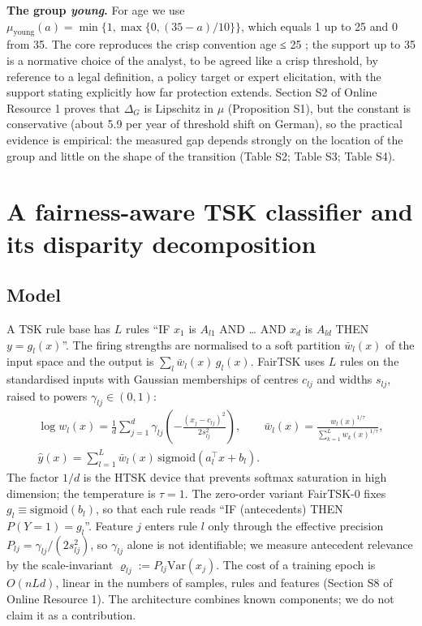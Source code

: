 \textbf{The group \emph{young}.} For age we use \(\mu_{\text{young}}(a) = \min\{1,\max\{0,(35 - a)/10\}\}\), which equals 1 up to 25 and 0 from 35. The core reproduces the crisp convention age ≤ 25 \cite{lequy}; the support up to 35 is a normative choice of the analyst, to be agreed like a crisp threshold, by reference to a legal definition, a policy target or expert elicitation, with the support stating explicitly how far protection extends. Section S2 of Online Resource 1 proves that \(\Delta_G\) is Lipschitz in \(\mu\) (Proposition S1), but the constant is conservative (about 5.9 per year of threshold shift on German), so the practical evidence is empirical: the measured gap depends strongly on the location of the group and little on the shape of the transition (Table S2; Table S3; Table S4).

\hypertarget{a-fairness-aware-tsk-classifier-and-its-disparity-decomposition}{%
\section{A fairness-aware TSK classifier and its disparity decomposition}\label{a-fairness-aware-tsk-classifier-and-its-disparity-decomposition}}

\hypertarget{model}{%
\subsection{Model}\label{model}}

A TSK rule base \cite{tsk} has \(L\) rules ``IF \(x_1\) is \(A_{l1}\) AND \ldots{} AND \(x_d\) is \(A_{ld}\) THEN \(y = g_l(x)\)''. The firing strengths are normalised to a soft partition \(\bar w_l(x)\) of the input space and the output is \(\sum_l \bar w_l(x)\, g_l(x)\). FairTSK uses \(L\) rules on the standardised inputs with Gaussian memberships of centres \(c_{lj}\) and widths \(s_{lj}\), raised to powers \(\gamma_{lj} \in (0,1)\): \[\begin{gathered}\log w_{l}(x) = \frac{1}{d}\sum_{j = 1}^{d}\gamma_{lj}\left(-\frac{(x_{j} - c_{lj})^{2}}{2s_{lj}^{2}}\right),\qquad \bar{w}_{l}(x) = \frac{w_l(x)^{1/\tau}}{\sum_{k = 1}^{L}w_k(x)^{1/\tau}},\\ \hat{y}(x) = \sum_{l = 1}^{L}\bar{w}_{l}(x)\,\mathrm{sigmoid}(a_{l}^{\top}x + b_{l}).\end{gathered} \tag{2}\] The factor \(1/d\) is the HTSK device \cite{htsk} that prevents softmax saturation in high dimension; the temperature is \(\tau = 1\). The zero-order variant FairTSK-0 fixes \(g_l \equiv \mathrm{sigmoid}(b_l)\), so that each rule reads ``IF (antecedents) THEN \(P(Y = 1) = g_l\)''. Feature \(j\) enters rule \(l\) only through the effective precision \(P_{lj} = \gamma_{lj}/(2s_{lj}^2)\), so \(\gamma_{lj}\) alone is not identifiable; we measure antecedent relevance by the scale-invariant \(\varrho_{lj} := P_{lj}\mathrm{Var}(x_j)\). The cost of a training epoch is \(O(nLd)\), linear in the numbers of samples, rules and features (Section S8 of Online Resource 1). The architecture combines known components; we do not claim it as a contribution.

